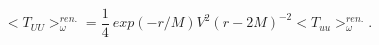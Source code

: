 \begin{equation}
<T_{UU}>^{ren.}_{\omega}=\frac{1}{4} ~exp(-r/M) V^{2} (r-2M)^{-2}
<T_{uu}>^{ren.}_{\omega}. \label{11}\end{equation}

